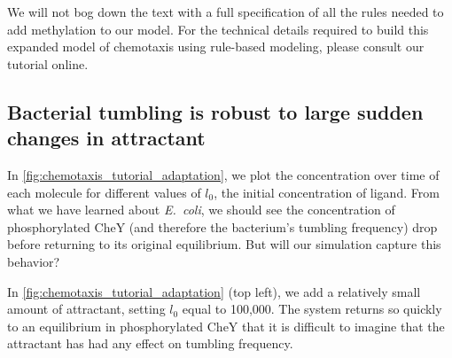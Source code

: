 We will not bog down the text with a full specification of all the rules needed to add methylation to our model. For the technical details required to build this expanded model of chemotaxis using rule-based modeling, please consult our tutorial online.



\FloatBarrier
{}
\subsection{Bacterial tumbling is robust to large sudden changes in attractant}

In \autoref{fig:chemotaxis_tutorial_adaptation}, we plot the concentration over time of each molecule for different values of $l_0$, the initial concentration of ligand. From what we have learned about \textit{E.~coli}, we should see the concentration of phosphorylated CheY (and therefore the bacterium's tumbling frequency) drop before returning to its original equilibrium. But will our simulation capture this behavior?

In \autoref{fig:chemotaxis_tutorial_adaptation} (top left), we add a relatively small amount of attractant, setting $l_0$ equal to 100,000. The system returns so quickly to an equilibrium in phosphorylated CheY that it is difficult to imagine that the attractant has had any effect on tumbling frequency.

